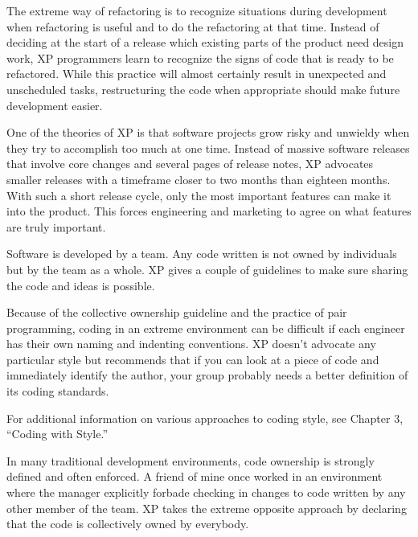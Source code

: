The extreme way of refactoring is to recognize situations during development when refactoring is useful and to do the refactoring at that time. Instead of deciding at the start of a release which existing parts of the product need design work, XP programmers learn to recognize the signs of code that is ready to be refactored. While this practice will almost certainly result in unexpected and unscheduled tasks, restructuring the code when appropriate should make future development easier.


One of the theories of XP is that software projects grow risky and unwieldy when they try to accomplish too much at one time. Instead of massive software releases that involve core changes and several pages of release notes, XP advocates smaller releases with a timeframe closer to two months than eighteen months. With such a short release cycle, only the most important features can make it into the product. This forces engineering and marketing to agree on what features are truly important.


Software is developed by a team. Any code written is not owned by individuals but by the team as a whole. XP gives a couple of guidelines to make sure sharing the code and ideas is possible.


Because of the collective ownership guideline and the practice of pair programming, coding in an extreme environment can be difficult if each engineer has their own naming and indenting conventions. XP doesn’t advocate any particular style but recommends that if you can look at a piece of code and immediately identify the author, your group probably needs a better definition of its coding standards.

For additional information on various approaches to coding style, see Chapter 3, “Coding with Style.”


In many traditional development environments, code ownership is strongly defined and often enforced. A friend of mine once worked in an environment where the manager explicitly forbade checking in changes to code written by any other member of the team. XP takes the extreme opposite approach by declaring that the code is collectively owned by everybody.

